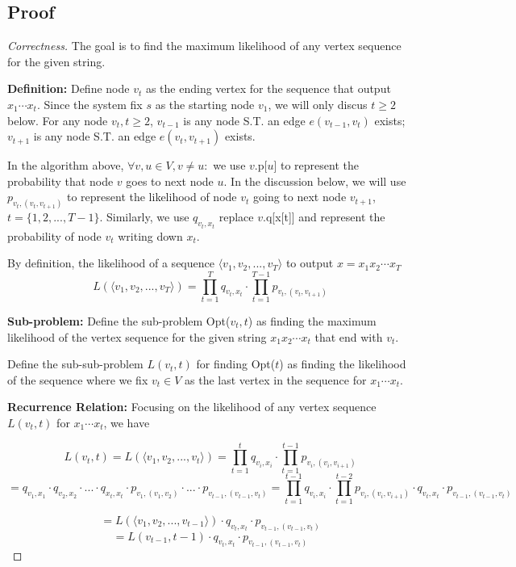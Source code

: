 \documentclass[openany]{article}
\begin{document}
\subsection*{Proof}
\begin{proof}[Correctness]{} The goal is to find the maximum likelihood of any vertex sequence for the given string.

\textbf{Definition:} 
Define node $v_t$ as the ending vertex for the sequence that output $x_1\cdots x_t$. Since the system fix $s$ as the starting node $v_1$, we will only discus $t\geq 2$ below. For any node $v_t, t\geq 2$, $v_{t-1}$ is any node S.T. an edge $e(v_{t-1}, v_{t})$ exists; $v_{t+1}$ is any node S.T. an edge $e(v_t, v_{t+1})$ exists.

In the algorithm above, $\forall v,u\in V, v\neq u:$  we use $v$.p[$u$] to represent the probability that node $v$ goes to next node $u$. In the discussion below, we will use $p_{v_t,(v_t,v_{t+1})}$ to represent the likelihood of node $v_t$ going to next node $v_{t+1}$, $ t=\{1,2,...,T-1\}$. Similarly, we use $q_{v_t,x_t}$ replace $v.$q[x[t]] and represent the probability of node $v_t$ writing down $x_t$. 

By definition, the likelihood of a sequence $\langle v_1,v_2,...,v_T \rangle$ to output $x=x_1x_2\cdots x_T$
\[L(\langle v_1,v_2,...,v_T \rangle) = \prod_{t=1}^{T}q_{v_t,x_t} \cdot \prod_{t=1}^{T-1}p_{v_t,(v_t,v_{t+1})}  \]
    
\textbf{Sub-problem:} Define the sub-problem Opt($v_t, t$) as finding the maximum likelihood of the vertex sequence for the given string $x_1x_2\cdots x_t$ that end with $v_t$.

Define the sub-sub-problem $L(v_t,t)$ for finding Opt($t$) as finding the likelihood of the sequence where we fix $v_t\in V$ as the last vertex in the sequence for $x_1 \cdots x_t$.
    
\textbf{Recurrence Relation:} Focusing on the likelihood of any vertex sequence $L(v_t,t)$ for $x_1\cdots x_t$, we have

\[L(v_t,t)=L(\langle v_1,v_2,...,v_t \rangle)=
\prod_{t=1}^{t}q_{v_i,x_i} \cdot \prod_{t=1}^{t-1}p_{v_i,(v_i,v_{i+1})}\]
\[=q_{v_1,x_1}\cdot q_{v_2,x_2} \cdot ... \cdot q_{x_t, x_t} \cdot p_{v_1,(v_1, v_2)} \cdot ...\cdot p_{v_{t-1},(v_{t-1}, v_{t})}=\prod_{t=1}^{t-1}q_{v_i,x_i} \cdot \prod_{t=1}^{t-2}p_{v_i,(v_i,v_{i+1})} \cdot q_{v_t,x_t} \cdot p_{v_{t-1},(v_{t-1},v_t)}\]


\[= L(\langle v_1,v_2,...,v_{t-1} \rangle)\cdot q_{v_t,x_t} \cdot p_{v_{t-1},(v_{t-1},v_t)} \]
\[= L(v_{t-1}, t-1) \cdot q_{v_t,x_t} \cdot p_{v_{t-1},(v_{t-1},v_t)}  \]


\end{proof}
\end{document}
